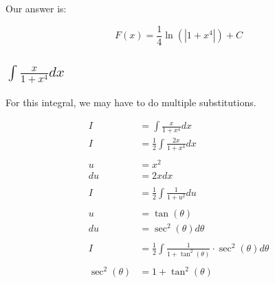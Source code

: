 \documentclass[12pt]{article}
\begin{document}
Our answer is:

$$
    F(x) = \frac{1}{4} \ln(|1+x^4|) + C
$$

\subsection{$\int \frac{x}{1+x^4} dx$}

For this integral, we may have to do multiple substitutions.


\begin{align}
    I              & = \int \frac{x}{1+x^4} dx                                                  \\
    I              & = \frac{1}{2} \int \frac{2x}{1+x^4} dx                                     \\
    \nonumber                                                                                   \\
    u              & = x^2                                                                      \\
    du             & = 2x dx                                                                    \\
    \nonumber                                                                                   \\
    I              & = \frac{1}{2} \int \frac{1}{1+u^2} du                                      \\
    \nonumber                                                                                   \\
    u              & = \tan(\theta)                                                             \\
    du             & = \sec^2(\theta) d\theta                                                   \\
    \nonumber                                                                                   \\
    I              & = \frac{1}{2} \int \frac{1}{1+\tan^2(\theta)} \cdot \sec^2(\theta) d\theta \\
    \nonumber                                                                                   \\
    \sec^2(\theta) & = 1 + \tan^2(\theta)                                                       \\
    \nonumber                                                                                   \\

\end{align}
\end{document}
